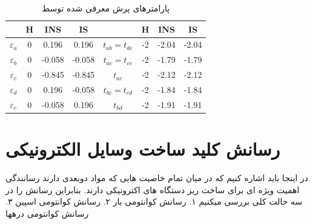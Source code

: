 \begin{table}
  \centering
  \caption{پارامترهای پرش  معرفی شده توسط \cite{ezawaTripletFermionsDirac2017}\label{tbl:hoppingtable}}
\begin{latin}
  \begin{tabular}{cccccccc}
  \toprule
   & H & INS & IS &
   & H & INS & IS\\
  \midrule
  $\varepsilon_a$& 0 &  0.196 &  0.196 & $t_{ab}=t_{de}$& -2 & -2.04 & -2.04 \\
  $\varepsilon_b$& 0 & -0.058 & -0.058 & $t_{ac}=t_{ce}$& -2 & -1.79 & -1.79 \\
  $\varepsilon_c$& 0 & -0.845 & -0.845 & $t_{ae}$& -2 & -2.12 & -2.12   \\
  $\varepsilon_d$& 0 &  0.196 & -0.058 & $t_{bc}=t_{cd}$& -2 & -1.84 & -1.84 \\
  $\varepsilon_e$& 0 & -0.058 &  0.196 & $t_{bd}$& -2 & -1.91 & -1.91  \\
  \bottomrule
  \end{tabular}
  \end{latin}
\end{table}
\section{رسانش کلید ساخت وسایل الکترونیکی}
در اینجا باید اشاره کنیم که در میان تمام خاصیت هایی که مواد دوبعدی دارند رسانندگی اهمیت ویژه ای برای ساخت ریز دستگاه های اکترونیکی دارند. بنابراین رسانش را در سه حالت کلی بررسی میکنیم
۱. رسانش کوانتومی بار
۲. رسانش کوانتومی اسپین
۳. رسانش کوانتومی درهها
